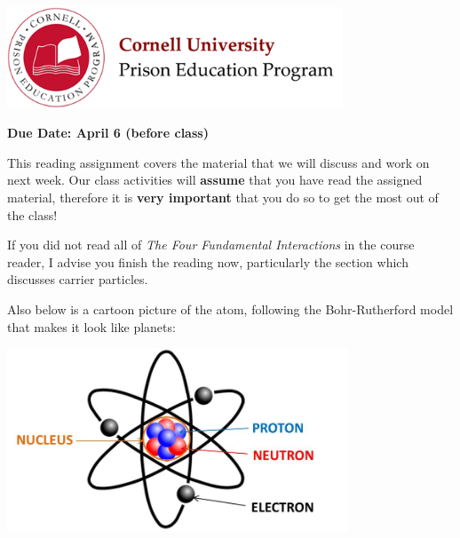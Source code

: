 \documentclass[addpoints,12pt]{exam}
\begin{document}

\begin{flushright}
\vspace{0.2in}

\end{flushright}

\begin{center}
\includegraphics[width=10cm]{../images/logo.png}
\end{center}

\begin{center}
\end{center}

\noindent\begin{large}\textbf{Due Date: April 6 (before class)}\end{large}
\vspace{0.2in}

This reading assignment covers the material that we will discuss and work on next week. Our class activities will \textbf{assume} that you have read the assigned material, therefore it is \textbf{very important} that you do so to get the most out of the class!

If you did not read all of \textit{The Four Fundamental Interactions} in the course reader, I advise you finish the reading now, particularly the section which discusses carrier particles.

Also below is a cartoon picture of the atom, following the Bohr-Rutherford model that makes it look like planets:

\noindent \begin{center}\includegraphics[width=4in]{../images/atom.jpg}\end{center}
\end{document}
